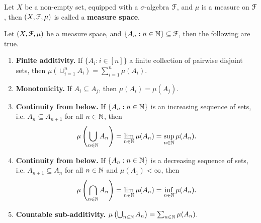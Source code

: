 \documentclass[a4paper,english,12pt]{article}
\begin{document}
\begin{defn}%
Let $X$ be a non-empty set, equipped with a $\sigma$-algebra $\mathcal{F}$, and $\mu$ is a measure on $\mathcal{F}$, then $(X, \mathcal{F}, \mu)$ is called a \textbf{measure space}.
\end{defn}
\begin{thm} Let $(X, \mathcal{F}, \mu)$ be a measure space, and $\{A_n: n \in \mathbb{N} \} \subseteq \mathcal{F}$, then the following are true.
\begin{enumerate}
	\item \textbf{Finite additivity.} If $\{A_i: i \in [n]\}$ a finite collection of pairwise disjoint sets, then $\mu(\cup_{i = 1}^nA_i) = \sum_{i = 1}^n\mu(A_i)$.
	\item \textbf{Monotonicity.} If $A_i \subseteq A_j$, then $\mu(A_i) = \mu(A_j)$.
	\item \textbf{Continuity from below.} If $\{A_n: n \in \mathbb{N}\}$ is an increasing sequence of sets, i.e. $A_n \subseteq A_{n+1}$ for all $n \in \mathbb{N}$, then 
	\begin{align*}
	\mu\left(\bigcup_{n \in \mathbb{N}} A_n\right) = \lim_{n \in \mathbb{N}}\mu(A_n) = \sup_{n \in \mathbb{N}}\mu(A_n).
	\end{align*}
	\item \textbf{Continuity from below.} If $\{A_n: n \in \mathbb{N}\}$ is a decreasing sequence of sets, i.e. $A_{n+1} \subseteq A_{n}$ for all $n \in \mathbb{N}$ and $\mu(A_1) < \infty$, then
	\begin{align*}
	\mu\left(\bigcap_{n \in \mathbb{N}} A_n\right) = \lim_{n \in \mathbb{N}}\mu(A_n) = \inf_{n \in \mathbb{N}}\mu(A_n).
	\end{align*}
	\item \textbf{Countable sub-additivity.} $\mu\left(\bigcup_{n \in \mathbb{N}}A_n\right) = \sum_{n \in \mathbb{N}} \mu(A_n)$.
\end{enumerate}
\end{thm}
\end{document}
